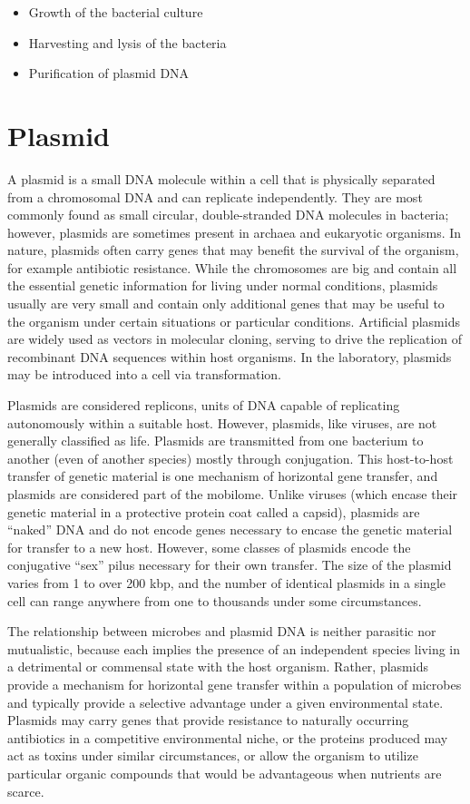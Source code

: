 \documentclass[]{book}
\providecommand{\tightlist}{%
  \setlength{\itemsep}{0pt}\setlength{\parskip}{0pt}}
\begin{document}
\begin{itemize}
\tightlist
\item
  Growth of the bacterial culture
\item
  Harvesting and lysis of the bacteria
\item
  Purification of plasmid DNA
\end{itemize}

\hypertarget{plasmid}{%
\section{Plasmid}\label{plasmid}}

A plasmid is a small DNA molecule within a cell that is physically separated from a chromosomal DNA and can replicate independently. They are most commonly found as small circular, double-stranded DNA molecules in bacteria; however, plasmids are sometimes present in archaea and eukaryotic organisms. In nature, plasmids often carry genes that may benefit the survival of the organism, for example antibiotic resistance. While the chromosomes are big and contain all the essential genetic information for living under normal conditions, plasmids usually are very small and contain only additional genes that may be useful to the organism under certain situations or particular conditions. Artificial plasmids are widely used as vectors in molecular cloning, serving to drive the replication of recombinant DNA sequences within host organisms. In the laboratory, plasmids may be introduced into a cell via transformation.

Plasmids are considered replicons, units of DNA capable of replicating autonomously within a suitable host. However, plasmids, like viruses, are not generally classified as life. Plasmids are transmitted from one bacterium to another (even of another species) mostly through conjugation. This host-to-host transfer of genetic material is one mechanism of horizontal gene transfer, and plasmids are considered part of the mobilome. Unlike viruses (which encase their genetic material in a protective protein coat called a capsid), plasmids are ``naked'' DNA and do not encode genes necessary to encase the genetic material for transfer to a new host. However, some classes of plasmids encode the conjugative ``sex'' pilus necessary for their own transfer. The size of the plasmid varies from 1 to over 200 kbp, and the number of identical plasmids in a single cell can range anywhere from one to thousands under some circumstances.

The relationship between microbes and plasmid DNA is neither parasitic nor mutualistic, because each implies the presence of an independent species living in a detrimental or commensal state with the host organism. Rather, plasmids provide a mechanism for horizontal gene transfer within a population of microbes and typically provide a selective advantage under a given environmental state. Plasmids may carry genes that provide resistance to naturally occurring antibiotics in a competitive environmental niche, or the proteins produced may act as toxins under similar circumstances, or allow the organism to utilize particular organic compounds that would be advantageous when nutrients are scarce.
\end{document}
